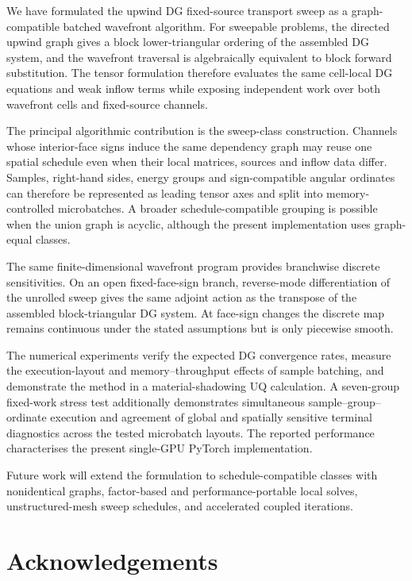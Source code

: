 \documentclass[final]{amsart}
\begin{document}
We have formulated the upwind DG fixed-source transport sweep as a
graph-compatible batched wavefront algorithm. For sweepable problems,
the directed upwind graph gives a block lower-triangular ordering of
the assembled DG system, and the wavefront traversal is algebraically
equivalent to block forward substitution. The tensor formulation
therefore evaluates the same cell-local DG equations and weak inflow
terms while exposing independent work over both wavefront cells and
fixed-source channels.

The principal algorithmic contribution is the sweep-class construction.
Channels whose interior-face signs induce the same dependency graph may
reuse one spatial schedule even when their local matrices, sources and
inflow data differ. Samples, right-hand sides, energy groups and
sign-compatible angular ordinates can therefore be represented as
leading tensor axes and split into memory-controlled microbatches. A
broader schedule-compatible grouping is possible when the union graph
is acyclic, although the present implementation uses graph-equal
classes.

The same finite-dimensional wavefront program provides branchwise
discrete sensitivities. On an open fixed-face-sign branch,
reverse-mode differentiation of the unrolled sweep gives the same
adjoint action as the transpose of the assembled block-triangular DG
system. At face-sign changes the discrete map remains continuous under
the stated assumptions but is only piecewise smooth.

The numerical experiments verify the expected DG convergence rates,
measure the execution-layout and memory--throughput effects of sample
batching, and demonstrate the method in a material-shadowing UQ
calculation. A seven-group fixed-work stress test additionally
demonstrates simultaneous sample--group--ordinate execution and
agreement of global and spatially sensitive terminal diagnostics across
the tested microbatch layouts. The reported performance characterises
the present single-GPU PyTorch implementation.

Future work will extend the formulation to schedule-compatible classes
with nonidentical graphs, factor-based and performance-portable local
solves, unstructured-mesh sweep schedules, and accelerated coupled
iterations.


\section*{Acknowledgements}
\end{document}
